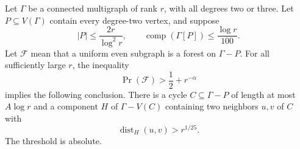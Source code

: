 \begin{theorem}
\label{thm:polynomial-gap-detour}
Let $\Gamma$ be a connected multigraph of rank $r$, with all degrees two or three.
Let $P\subseteq V(\Gamma)$ contain every degree-two vertex, and suppose
\[
 |P|\le\frac{2r}{\log^2r},\qquad
 \operatorname{comp}(\Gamma[P])\le\frac{\log r}{100}.
\]
Let $\mathcal F$ mean that a uniform even subgraph is a forest on $\Gamma-P$.
For all sufficiently large $r$, the inequality
\[
 \Pr(\mathcal F)>\frac12+r^{-\alpha}
\]
implies the following conclusion.
There is a cycle $C\subseteq\Gamma-P$ of length at most $A\log r$ and a component $H$ of $\Gamma-V(C)$ containing two neighbors $u,v$ of $C$ with
\[
 \operatorname{dist}_H(u,v)>r^{1/25}.
\]
The threshold is absolute.
\end{theorem}

